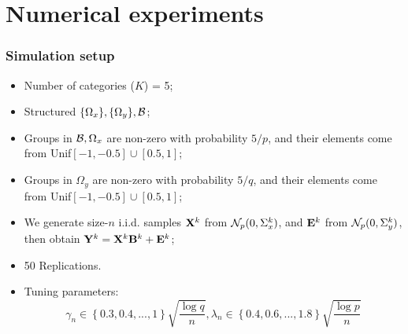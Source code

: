 \documentclass[10pt]{beamer}
\theoremstyle{definition}
\begin{document}
\section{Numerical experiments}

\begin{frame}
\frametitle{Simulation setup}
\begin{itemize}
\item Number of categories ($K$) = 5;

\item Structured $\{ \Omega_x\}, \{\Omega_y\}, {\cal{B}}$;

\item Groups in ${\cal{B}},\Omega_x$ are non-zero with probability $5/p$, and their elements come from Unif$[-1, -0.5] \cup [0.5,1]$;

\item Groups in $\Omega_y$ are non-zero with probability $5/q$, and their elements come from Unif$[-1, -0.5] \cup [0.5,1]$;

\item We generate size-$n$ i.i.d. samples ${\mathbf{X}}^k$ from ${\cal{N}}_p(0, \Sigma_x^k)$, and ${\mathbf{E}}^k$ from ${\cal{N}}_p(0, \Sigma_y^k)$, then obtain ${\mathbf{Y}}^k = {\mathbf{X}}^k {\mathbf{B}}^k + {\mathbf{E}}^k$;

\item 50 Replications.

\item Tuning parameters:
$$
\gamma_n \in \left\{ 0.3, 0.4, ..., 1 \right\} \sqrt{\frac{\log q}{n}}, 
\lambda_n \in \left\{ 0.4, 0.6, ..., 1.8 \right\} \sqrt{\frac{\log p}{n}}
$$

\end{itemize}
\end{frame}
\end{document}
